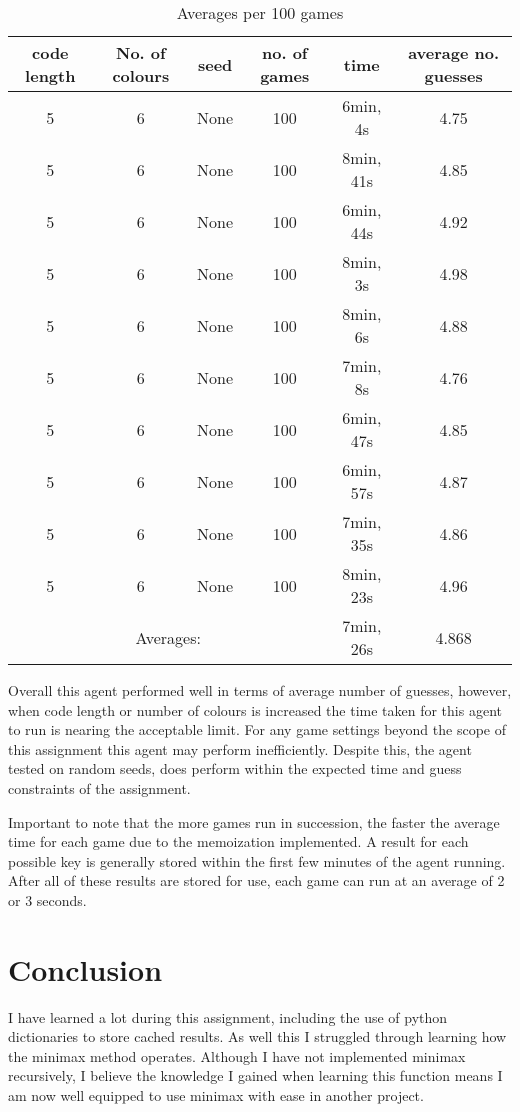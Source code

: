 \documentclass[12pt]{article}
\begin{document}
\begin{table}[htbp]
\centering
\begin{tabular}{|c|c|c|c|c|c|}
\hline
code length & No. of colours & seed & no. of games & time & average no. guesses\\\hline
5 & 6 & None & 100 & 6min, 4s & 4.75\\
5 & 6 & None & 100 & 8min, 41s & 4.85\\
5 & 6 & None & 100 & 6min, 44s & 4.92\\
5 & 6 & None & 100 & 8min, 3s & 4.98\\
5 & 6 & None & 100 & 8min, 6s & 4.88\\
5 & 6 & None & 100 & 7min, 8s & 4.76\\
5 & 6 & None & 100 & 6min, 47s & 4.85\\
5 & 6 & None & 100 & 6min, 57s & 4.87\\
5 & 6 & None & 100 & 7min, 35s & 4.86\\
5 & 6 & None & 100 & 8min, 23s & 4.96\\
\hline
\multicolumn{4}{|c|}{Averages: } & 7min, 26s & 4.868\\
\hline
\end{tabular}
\caption{\label{tab:results2}Averages per 100 games}
\end{table}

Overall this agent performed well in terms of average number of guesses, however, when code length or number of colours is increased the time taken for this agent to run is nearing the acceptable limit. For any game settings beyond the scope of this assignment this agent may perform inefficiently. Despite this, the agent tested on random seeds, does perform within the expected time and guess constraints of the assignment.

Important to note that the more games run in succession, the faster the average time for each game due to the memoization implemented. A result for each possible key is generally stored within the first few minutes of the agent running. After all of these results are stored for use, each game can run at an average of 2 or 3 seconds.


\section{Conclusion}
I have learned a lot during this assignment, including the use of python dictionaries to store cached results. As well this I struggled through learning how the minimax method operates. Although I have not implemented minimax recursively, I believe the knowledge I gained when learning this function means I am now well equipped to use minimax with ease in another project.
\end{document}
